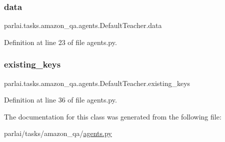 \subsubsection{\texorpdfstring{data}{data}}
{\footnotesize\ttfamily parlai.\+tasks.\+amazon\+\_\+qa.\+agents.\+Default\+Teacher.\+data}



Definition at line 23 of file agents.\+py.

\mbox{\label{classparlai_1_1tasks_1_1amazon__qa_1_1agents_1_1DefaultTeacher_a7d3a8cac76a5dcbdc7aecc9376f79bc9}} 
\subsubsection{\texorpdfstring{existing\+\_\+keys}{existing\_keys}}
{\footnotesize\ttfamily parlai.\+tasks.\+amazon\+\_\+qa.\+agents.\+Default\+Teacher.\+existing\+\_\+keys}



Definition at line 36 of file agents.\+py.



The documentation for this class was generated from the following file\+:\begin{DoxyCompactItemize}
\item 
parlai/tasks/amazon\+\_\+qa/\hyperlink{parlai_2tasks_2amazon__qa_2agents_8py}{agents.\+py}\end{DoxyCompactItemize}

